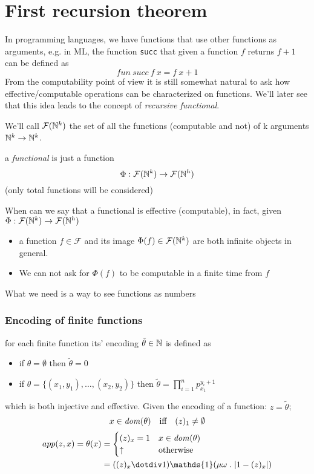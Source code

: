 \chapter{First recursion theorem}

In programming languages, we have functions that use other functions as arguments,
e.g. in ML, the function \texttt{succ} that
given a function $f$ returns $f+1$ can be defined as
\begin{equation*}
    fun\ succ\ f\ x = f\ x + 1
\end{equation*}
From the computability point of view it is still somewhat natural to ask
how effective/computable operations can be characterized on
functions. We'll later see that this idea leads to the concept of
\emph{recursive functional}.

\begin{definition}
  We'll call $\mathcal{F}(\mathbb{N}^k)$ the set of all the functions
  (computable and not) of k arguments $\mathbb{N}^k \to \mathbb{N}^k$.
\end{definition}

a \emph{functional} is just a function
\[
  \Phi : \mathcal{F}(\mathbb{N}^k) \to \mathcal{F}(\mathbb{N}^h)
\]
(only total functions will be considered)

When can we say that a functional is effective (computable), in fact,
given $\Phi : \mathcal{F}(\mathbb{N}^k) \to \mathcal{F}(\mathbb{N}^h)$
\begin{itemize}
\item a function $f \in \mathcal{F}$ and its image
  $\Phi(f) \in \mathcal{F}(\mathbb{N}^k)$ are both infinite objects in
  general.
\item We can not ask for $\Phi(f)$ to be computable in a finite time
  from $f$
\end{itemize}

What we need is a way to see functions as numbers

\subsection{Encoding of finite functions}
for each finite function its' encoding $\tilde{\theta} \in \mathbb{N}$ is defined
as
\begin{itemize}
\item if $\theta = \emptyset$ then $\tilde{\theta} = 0$
\item if $\theta = \{(x_1, y_1), \dots, (x_2, y_2)\}$ then
  $\tilde{\theta} = \prod_{i=1}^n p_{x_1}^{y_i+1}$
\end{itemize}
which is both injective and effective. Given the encoding of a function:
$z= \tilde{\theta}$;
\[
  x \in \mathit{dom}({\theta}) \quad \mbox{iff} \quad (z)_1 \neq \emptyset
\]
\[
  \begin{aligned}
    app(z,x) = \theta(x) & = \begin{cases}
      (z)_x = 1 & x\in\dom{\theta} \\
      \uparrow & \mbox{otherwise}
    \end{cases} \\
    &= ((z)_x \dotdiv 1) \mathds{1}(\mu \omega \; . \; |1 - (z)_x|)
  \end{aligned}
\]

